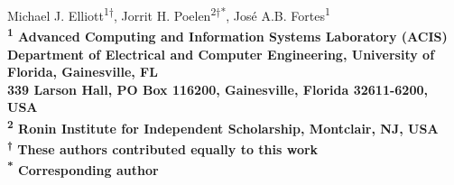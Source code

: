 \begin{flushleft}

{\Large
 \textbf{}
 }
 \newline
Michael J. Elliott\textsuperscript{1}\textsuperscript{†},
Jorrit H. Poelen\textsuperscript{2}\textsuperscript{†}\textsuperscript{*},
José A.B. Fortes\textsuperscript{1}
\bigskip
\\
\bf{\textsuperscript{1}} Advanced Computing and Information Systems Laboratory (ACIS)\\Department of Electrical and Computer Engineering, University of Florida, Gainesville, FL\\339 Larson Hall, PO Box 116200, Gainesville, Florida 32611-6200, USA
\\
\bf{\textsuperscript{2}} Ronin Institute for Independent Scholarship, Montclair, NJ, USA
\\
\bf{\textsuperscript{†}} These authors contributed equally to this work
\\
\bf{\textsuperscript{*}} Corresponding author
\bigskip


\end{flushleft}


